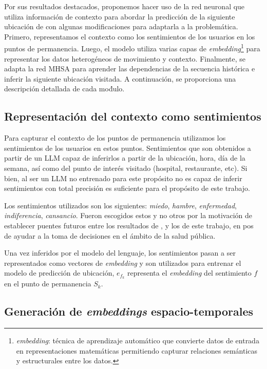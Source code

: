 Por sus resultados destacados, proponemos hacer uso de la red neuronal 
que utiliza información de contexto para 
abordar la predicción de la siguiente ubicación de \cite{Hong_2023}
con algunas modificaciones para adaptarla a la problemática. Primero, representamos el contexto 
como los sentimientos de los usuarios en los puntos de permanencia. 
Luego, el modelo utiliza varias capas de \textit{embedding}\footnote{\textit{embedding}: 
técnica de aprendizaje automático que convierte datos de entrada en
representaciones matem\'aticas permitiendo capturar relaciones
sem\'anticas y estructurales entre los datos.} para representar los 
datos heterogéneos de movimiento y contexto. Finalmente, 
se adapta la red MHSA para aprender las dependencias de la 
secuencia histórica e inferir la siguiente ubicación visitada. 
A continuación, se proporciona una descripción 
detallada de cada mo\'dulo.

\subsection{Representación del contexto como sentimientos}

Para capturar el contexto de los puntos de permanencia utilizamos 
los sentimientos de los usuarios en estos puntos. Sentimientos que son
obtenidos a partir de un LLM capaz de inferirlos a partir
de la ubicación, hora, d\'ia de la semana, as\'i como del punto de inter\'es
visitado (hospital, restaurante, etc). Si bien, al ser un LLM 
no entrenado para este prop\'osito
no es capaz de inferir sentimientos con total precisión
es suficiente para el prop\'osito de este trabajo.

Los sentimientos utilizados
son los siguientes: \textit{miedo}, \textit{hambre}, 
\textit{enfermedad}, \textit{indiferencia}, \textit{cansancio}. Fueron 
escogidos estos y no otros por la motivaci\'on de establecer puentes futuros 
entre los resultados de \cite{Hernandez2023},
y los de este trabajo, en pos de ayudar a la toma de decisiones
en el \'ambito de la salud p\'ublica.

Una vez inferidos por el modelo del lenguaje, los sentimientos pasan a ser 
representados como vectores de \textit{embedding} y son utilizados
para entrenar el modelo de predicción de ubicación, \(e_{f_k}\) representa
el \textit{embedding} del sentimiento \(f\) en el punto de permanencia \(S_k\).

\subsection{Generación de \textit{embeddings} espacio-temporales}

